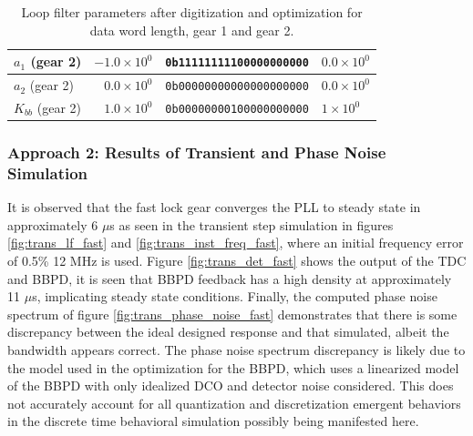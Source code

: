 \begin{table}[h!]
\begin{tabular}{|l|r|r|l|}
		\hline 
		\rule[-1ex]{0pt}{2.5ex} \textbf{$a_1$} {\color{blue} (gear 2)} & $-1.0\times10^0$ & \texttt{0b11111111100000000000} & $0.0\times10^0$ \\ 
		\hline 
		\rule[-1ex]{0pt}{2.5ex} \textbf{$a_2$} {\color{blue} (gear 2)} & $0.0\times10^0$ & \texttt{0b00000000000000000000} & $0.0\times10^0$ \\ 
		\hline 
		\rule[-1ex]{0pt}{2.5ex} \textbf{$K_{bb}$} {\color{blue} (gear 2)} & $1.0\times10^0$ & \texttt{0b00000000100000000000} & $1\times10^0$ \\ 
		\hline 
	\end{tabular} 
	\caption{Loop filter parameters after digitization and optimization for data word length, gear 1 and gear 2.}
	\label{dig_filter_params_fast}
\end{table}  

\subsubsection{Approach 2: Results of Transient and Phase Noise Simulation}
It is observed that the fast lock gear converges the PLL to steady state in approximately 6 $\mu$s as seen in the transient step simulation in figures \ref{fig:trans_lf_fast} and \ref{fig:trans_inst_freq_fast}, where an initial frequency error of 0.5\% {12 MHz} is used. Figure \ref{fig:trans_det_fast} shows the output of the TDC and BBPD, it is seen that BBPD feedback has a high density at approximately 11 $\mu$s, implicating steady state conditions. Finally, the computed phase noise spectrum of figure \ref{fig:trans_phase_noise_fast} demonstrates that there is some discrepancy between the ideal designed response and that simulated, albeit the bandwidth appears correct. The phase noise spectrum discrepancy is likely due to the model used in the optimization for the BBPD, which uses a linearized model of the BBPD with only idealized DCO and detector noise considered. This does not accurately account for all quantization and discretization emergent behaviors in the discrete time behavioral simulation possibly being manifested here. 

